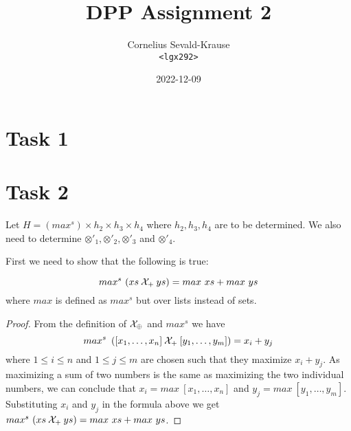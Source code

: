 \documentclass{article}
\begin{document}
\title{DPP Assignment 2}
\author{Cornelius Sevald-Krause \\ \texttt{<lgx292>}}
\date{2022-12-09}
\maketitle

\section*{Task 1}

\section*{Task 2}

Let $H = (max^s) \times h_2 \times h_3 \times h_4$ where $h_2 , h_3 , h_4$ are
to be determined. We also need to determine $\otimes'_1 , \otimes'_2 ,
\otimes'_3$ and $\otimes'_4$.

First we need to show that the following is true:

\begin{equation}\label{eq:max_cross}
    max^s\ (xs \mathbin{\mathcal{X}}_{+} ys) = max\ xs + max\ ys
\end{equation}
where $max$ is defined as $max^s$ but over lists instead of sets.

\begin{proof}
    From the definition of $\mathbin{\mathcal{X}}_{\oplus}$ and $max^s$ we have
    \[
        max^s\ \left(
            [x_1, \ldots, x_n] \mathbin{\mathcal{X}}_{+} [y_1, \ldots, y_m]
        \right) = x_i + y_j
    \]
    where $1 \leq i \leq n$ and $1 \leq j \leq m$ are chosen such that they
    maximize $x_i + y_j$. As maximizing a sum of two numbers is the same as
    maximizing the two individual numbers, we can conclude that
    $x_i = max\ [x_1, \ldots, x_n]$ and $y_j = max\ [y_1, \ldots, y_m]$.
    Substituting $x_i$ and $y_j$ in the formula above we get
    $max^s\ (xs \mathbin{\mathcal{X}}_{+} ys) = max\ xs + max\ ys$.
\end{proof}
\end{document}
